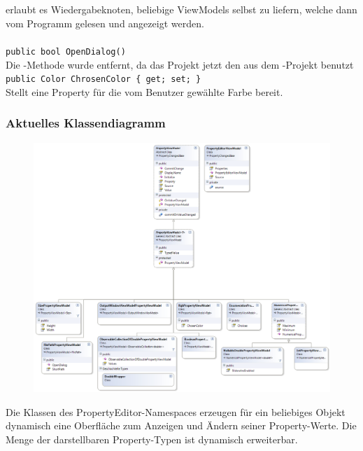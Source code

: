 \paragraph{}~\\
 erlaubt es Wiedergabeknoten, beliebige ViewModels selbst zu liefern, welche dann vom Programm gelesen und angezeigt werden.

\paragraph{}
\begin{itemize}
	\remove \verb!public bool OpenDialog()! \\
	Die -Methode wurde entfernt, da das Projekt jetzt den  aus dem -Projekt benutzt
	\add \verb!public Color ChrosenColor { get; set; }! \\
	Stellt eine Property für die vom Benutzer gewählte Farbe bereit.
\end{itemize}
\newpage

\subsubsection*{Aktuelles Klassendiagramm}
\begin{figure}[h!]
\begin{center}
\includegraphics[width=\textwidth]{classdiagram/propertyeditorvm.png}
\end{center}
\end{figure}
Die Klassen des PropertyEditor-Namespaces erzeugen für ein beliebiges Objekt dynamisch eine Oberfläche zum Anzeigen und Ändern seiner Property-Werte. Die Menge der darstellbaren Property-Typen ist dynamisch erweiterbar.
\newpage


